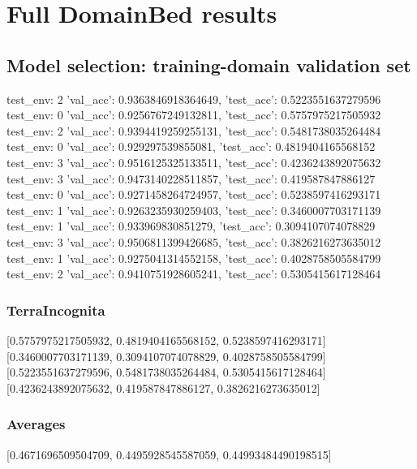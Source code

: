 \documentclass{article}
\begin{document}
\section{Full DomainBed results}

\subsection{Model selection: training-domain validation set}
test_env: 2
{'val_acc': 0.9363846918364649, 'test_acc': 0.5223551637279596}
test_env: 0
{'val_acc': 0.9256767249132811, 'test_acc': 0.5757975217505932}
test_env: 2
{'val_acc': 0.9394419259255131, 'test_acc': 0.5481738035264484}
test_env: 0
{'val_acc': 0.929297539855081, 'test_acc': 0.4819404165568152}
test_env: 3
{'val_acc': 0.9516125325133511, 'test_acc': 0.4236243892075632}
test_env: 3
{'val_acc': 0.9473140228511857, 'test_acc': 0.419587847886127}
test_env: 0
{'val_acc': 0.9271458264724957, 'test_acc': 0.5238597416293171}
test_env: 1
{'val_acc': 0.9263235930259403, 'test_acc': 0.3460007703171139}
test_env: 1
{'val_acc': 0.933969830851279, 'test_acc': 0.3094107074078829}
test_env: 3
{'val_acc': 0.9506811399426685, 'test_acc': 0.3826216273635012}
test_env: 1
{'val_acc': 0.9275041314552158, 'test_acc': 0.4028758505584799}
test_env: 2
{'val_acc': 0.9410751928605241, 'test_acc': 0.5305415617128464}

\subsubsection{TerraIncognita}
[0.5757975217505932, 0.4819404165568152, 0.5238597416293171]
[0.3460007703171139, 0.3094107074078829, 0.4028758505584799]
[0.5223551637279596, 0.5481738035264484, 0.5305415617128464]
[0.4236243892075632, 0.419587847886127, 0.3826216273635012]

\begin{center}
\end{center}

\subsubsection{Averages}
[0.4671696509504709, 0.4495928545587059, 0.44993484490198515]

\begin{center}
\end{center}
\end{document}
